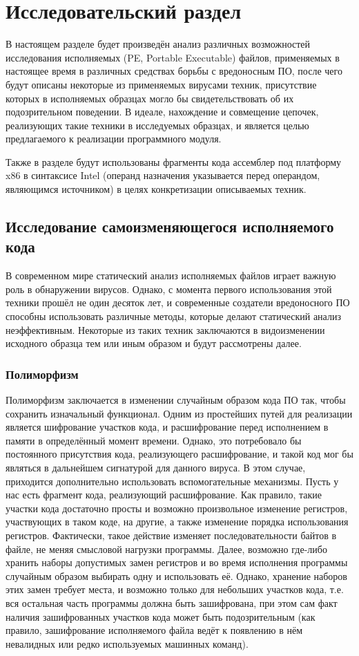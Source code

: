 \section {Исследовательский раздел}
В настоящем разделе будет произведён анализ различных возможностей исследования исполняемых (PE, Portable Executable) файлов, применяемых в настоящее время в различных средствах борьбы с вредоносным ПО, после чего  будут описаны некоторые из применяемых вирусами техник, присутствие которых в исполняемых образцах могло бы свидетельствовать об их подозрительном поведении. В идеале, нахождение и совмещение цепочек, реализующих такие техники в исследуемых образцах, и является целью предлагаемого к реализации программного модуля.

Также в разделе будут использованы фрагменты кода ассемблер под платформу x86 в синтаксисе Intel (операнд назначения указывается перед операндом, являющимся источником) в целях конкретизации описываемых техник.
\subsection {Исследование самоизменяющегося исполняемого кода}
В современном мире статический анализ исполняемых файлов играет важную роль в обнаружении вирусов. Однако, с момента первого использования этой техники прошёл не один десяток лет, и современные создатели вредоносного ПО способны использовать  различные методы, которые делают статический анализ неэффективным. Некоторые из таких техник заключаются в видоизменении исходного образца тем или иным образом и будут рассмотрены далее. 
\subsubsection {Полиморфизм}
Полиморфизм заключается в изменении случайным образом кода ПО так, чтобы сохранить изначальный функционал. Одним из простейших путей для реализации является шифрование участков кода, и расшифрование перед исполнением в памяти в определённый момент времени. Однако, это потребовало бы постоянного присутствия кода, реализующего расшифрование, и такой код мог бы являться в дальнейшем сигнатурой для данного вируса. В этом случае, приходится дополнительно использовать вспомогательные механизмы. Пусть у нас есть фрагмент кода, реализующий расшифрование. Как правило, такие участки кода достаточно просты и возможно произвольное изменение регистров, участвующих в таком коде, на другие, а также изменение порядка использования регистров. Фактически, такое действие изменяет последовательности байтов в файле, не меняя смысловой нагрузки программы. Далее, возможно где-либо хранить наборы допустимых замен регистров и во время исполнения программы случайным образом выбирать одну и использовать её. Однако, хранение наборов этих замен требует места, и возможно только для небольших участков кода, т.е. вся остальная часть программы должна быть зашифрована, при этом сам факт наличия зашифрованных участков кода может быть подозрительным (как правило, зашифрование исполняемого файла ведёт к появлению в нём невалидных или редко используемых машинных команд).
